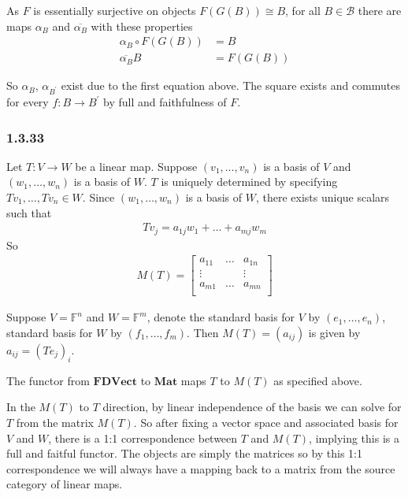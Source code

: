 \documentclass{article}
\begin{document}
\begin{center}
\end{center}

As $F$ is essentially surjective on objects $F(G(B)) \cong B$, for all $B \in \mathcal{B}$ there are maps $\alpha_B$ and $\overline{\alpha_B}$ with these properties
\begin{align*}
  \alpha_B \circ F(G(B)) &= B \\
  \overline{\alpha_B} B &=  F(G(B))
\end{align*}

So $\alpha_B$, $\alpha_{B^\prime}$ exist due to the first equation above. The square exists and commutes for every $f\colon B \rightarrow B^{\prime}$ by full and faithfulness of $F$.

\subsubsection*{1.3.33}

Let $T\colon V \rightarrow W$ be a linear map. Suppose $(v_1,\dots,v_n)$ is a basis of $V$ and $(w_1, \dots, w_n)$ is a basis of $W$.
$T$ is uniquely determined by specifying $Tv_1, \dots, Tv_n \in W$. Since $(w_1, \dots, w_n)$ is a basis of $W$, there exists unique scalars such that
\begin{align*}
 Tv_j = a_{1j}w_1 + \dots + a_{mj}w_m
\end{align*}
So
\begin{align*}
  M(T) =
  \begin{bmatrix}
    a_{11} & \dots & a_{1n} \\
    \vdots &  & \vdots \\
    a_{m1} & \dots & a_{mn} \\
  \end{bmatrix}
\end{align*}

Suppose $V=\mathds{F}^n$ and $W=\mathds{F}^m$, denote the standard basis for $V$ by $(e_1, \dots, e_n)$, standard basis for $W$ by $(f_1, \dots, f_m)$. Then $M(T) = ( a_{ij} ) $ is given by $a_{ij} = (Te_j)_i$.

The functor from $\mathbf{FDVect}$ to $\mathbf{Mat}$ maps $T$ to $M(T)$ as specified above.

In the $M(T)$ to $T$ direction, by linear independence of the basis we can solve for $T$ from the matrix $M(T)$. So after fixing a vector space and associated basis for $V$ and $W$, there is a 1:1 correspondence between $T$ and $M(T)$, implying this is a full and faitful functor. The objects are simply the matrices so by this 1:1 correspondence we will always have a mapping back to a matrix from the source category of linear maps.
\end{document}
